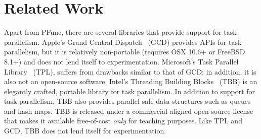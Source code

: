 \documentclass[9pt,twocolumn,letter]{article}
\begin{document}
\section{Related Work}
Apart from PFunc, there are several libraries that provide support for task 
parallelism.
%
Apple's Grand Central Dispatch~\cite{kn:gcd} (GCD) provides APIs for task
parallelism, but it is relatively non-portable (requires OSX 10.6+ or FreeBSD
8.1+) and does not lend itself to experimentation.
%
Microsoft's Task Parallel Library~\cite{kn:tpl} (TPL), suffers from drawbacks
similar to that of GCD; in addition, it is also not an open-source software.
%
Intel's Threading Building Blocks~\cite{kn:tbb} (TBB) is an elegantly crafted,
portable library for task parallelism.
%
In addition to support for task parallelism, TBB also provides parallel-safe 
data structures such as queues and hash maps.
%
TBB is released under a commercial-aligned open source license that makes it
available free-of-cost \textit{only} for teaching purposes.
%
Like TPL and GCD, TBB does not lend itself for experimentation.

\footnotesize


\end{document}
